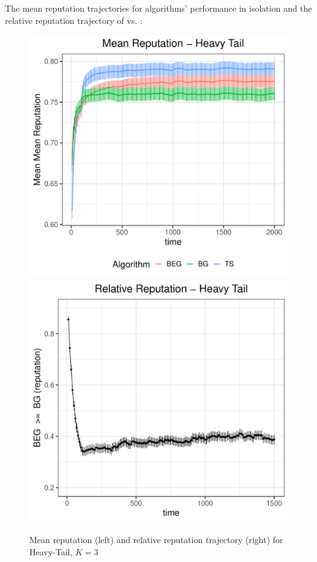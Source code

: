 \documentclass[../competing_bandits_with_appendix.tex]{subfiles}
\begin{document}
The mean reputation trajectories for algorithms' performance in isolation and the relative reputation trajectory of \DynamicEpsGreedy vs. \DynamicGreedy:
\begin{figure}[H]
\centering
\includegraphics[scale=0.35]{ec19paper/figures/mean_ht_3_arms}
\includegraphics[scale=0.35]{ec19paper/figures/rel_rep_ht_3_arms}
\caption{Mean reputation (left) and relative reputation trajectory (right) for Heavy-Tail, $K = 3$}
\end{figure}
\end{document}
